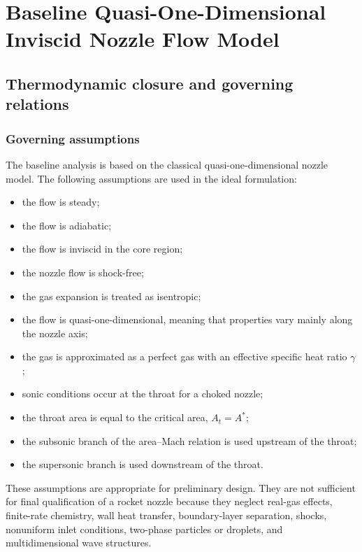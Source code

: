 \documentclass[11pt,a4paper]{article}
\begin{document}
\section{Baseline Quasi-One-Dimensional Inviscid Nozzle Flow Model}

\subsection{Thermodynamic closure and governing relations}

\subsubsection{Governing assumptions}

The baseline analysis is based on the classical quasi-one-dimensional nozzle model. The following assumptions are used in the ideal formulation:
\begin{itemize}
    \item the flow is steady;
    \item the flow is adiabatic;
    \item the flow is inviscid in the core region;
    \item the nozzle flow is shock-free;
    \item the gas expansion is treated as isentropic;
    \item the flow is quasi-one-dimensional, meaning that properties vary mainly along the nozzle axis;
    \item the gas is approximated as a perfect gas with an effective specific heat ratio $\gamma$;
    \item sonic conditions occur at the throat for a choked nozzle;
    \item the throat area is equal to the critical area, $A_t=A^*$;
    \item the subsonic branch of the area--Mach relation is used upstream of the throat;
    \item the supersonic branch is used downstream of the throat.
\end{itemize}

These assumptions are appropriate for preliminary design. They are not sufficient for final qualification of a rocket nozzle because they neglect real-gas effects, finite-rate chemistry, wall heat transfer, boundary-layer separation, shocks, nonuniform inlet conditions, two-phase particles or droplets, and multidimensional wave structures.
\end{document}
